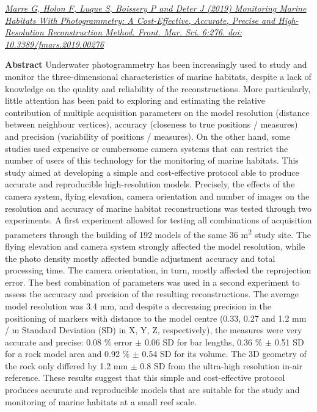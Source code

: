 \clearpage

\normalsize
\medskip


\noindent\href{https://doi.org/10.3389/fmars.2019.00276}{\textit{Marre G, Holon F, Luque S, Boissery P and Deter J (2019) Monitoring Marine Habitats With Photogrammetry: A Cost-Effective, Accurate, Precise and High-Resolution Reconstruction Method. Front. Mar. Sci. 6:276. doi: 10.3389/fmars.2019.00276}}

\medskip

\noindent\textbf{Abstract}
Underwater photogrammetry has been increasingly used to study and monitor the three-dimensional characteristics of marine habitats, despite a lack of knowledge on the quality and reliability of the reconstructions. More particularly, little attention has been paid to exploring and estimating the relative contribution of multiple acquisition parameters on the model resolution (distance between neighbour vertices), accuracy (closeness to true positions / measures) and precision (variability of positions / measures). On the other hand, some studies used expensive or cumbersome camera systems that can restrict the number of users of this technology for the monitoring of marine habitats. This study aimed at developing a simple and cost-effective protocol able to produce accurate and reproducible high-resolution models. Precisely, the effects of the camera system, flying elevation, camera orientation and number of images on the resolution and accuracy of marine habitat reconstructions was tested through two experiments. A first experiment allowed for testing all combinations of acquisition parameters through the building of 192 models of the same 36 m\textsuperscript{2} study site. The flying elevation and camera system strongly affected the model resolution, while the photo density mostly affected bundle adjustment accuracy and total processing time. The camera orientation, in turn, mostly affected the reprojection error. The best combination of parameters was used in a second experiment to assess the accuracy and precision of the resulting reconstructions. The average model resolution was 3.4 mm, and despite a decreasing precision in the positioning of markers with distance to the model centre (0.33, 0.27 and 1.2 mm / m Standard Deviation (SD) in X, Y, Z, respectively), the measures were very accurate and precise: 0.08 \% error $\pm$ 0.06 SD for bar lengths, 0.36 \% $\pm$ 0.51 SD for a rock model area and 0.92 \% $\pm$ 0.54 SD for its volume. The 3D geometry of the rock only differed by 1.2 mm $\pm$ 0.8 SD from the ultra-high resolution in-air reference. These results suggest that this simple and cost-effective protocol produces accurate and reproducible models that are suitable for the study and monitoring of marine habitats at a small reef scale.

